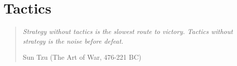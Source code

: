 \chapter{Tactics}
\begin{quotation}
\textit{Strategy without tactics is the slowest route to victory. Tactics without strategy is the noise before defeat.}\\
\begin{flushright}Sun Tzu (The Art of War, 476-221 BC)\end{flushright}
\end{quotation}







